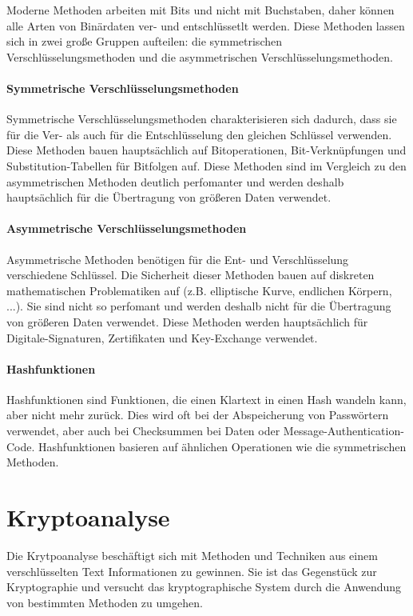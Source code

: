 \documentclass[11pt,a4paper]{report}
\begin{document}
Moderne Methoden arbeiten mit Bits und nicht mit Buchstaben, daher können alle Arten von Binärdaten ver- und entschlüssetlt werden. Diese Methoden lassen sich in zwei große Gruppen aufteilen: die symmetrischen Verschlüsselungsmethoden und die asymmetrischen Verschlüsselungsmethoden.

\paragraph{Symmetrische Verschlüsselungsmethoden} Symmetrische Verschlüsselungsmethoden charakterisieren sich dadurch, dass sie für die Ver- als auch für die Entschlüsselung den gleichen Schlüssel verwenden. Diese Methoden bauen hauptsächlich auf Bitoperationen, Bit-Verknüpfungen und Substitution-Tabellen für Bitfolgen auf. Diese Methoden sind im Vergleich zu den asymmetrischen Methoden deutlich perfomanter und werden deshalb hauptsächlich für die Übertragung von größeren Daten verwendet.

\paragraph{Asymmetrische Verschlüsselungsmethoden} Asymmetrische Methoden benötigen für die Ent- und Verschlüsselung verschiedene Schlüssel. Die Sicherheit dieser Methoden bauen auf diskreten mathematischen Problematiken auf (z.B. elliptische Kurve, endlichen Körpern, ...). Sie sind nicht so perfomant und werden deshalb nicht für die Übertragung von größeren Daten verwendet. Diese Methoden werden hauptsächlich für Digitale-Signaturen, Zertifikaten und Key-Exchange verwendet.

\paragraph{Hashfunktionen} Hashfunktionen sind Funktionen, die einen Klartext in einen Hash wandeln kann, aber nicht mehr zurück. Dies wird oft bei der Abspeicherung von Passwörtern verwendet, aber auch bei Checksummen bei Daten oder Message-Authentication-Code. Hashfunktionen basieren auf ähnlichen Operationen wie die symmetrischen Methoden.

\section{Kryptoanalyse}

Die Krytpoanalyse beschäftigt sich mit Methoden und Techniken aus einem verschlüsselten Text Informationen zu gewinnen. Sie ist das Gegenstück zur Kryptographie und versucht das kryptographische System durch die Anwendung von bestimmten Methoden zu umgehen.
\end{document}
